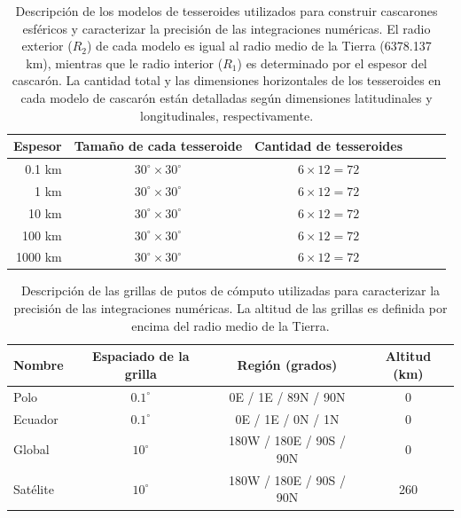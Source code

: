\begin{table}
\caption{
    Descripción de los modelos de tesseroides utilizados para construir
    cascarones esféricos y caracterizar la precisión de las integraciones
    numéricas.
    El radio exterior ($R_2$) de cada modelo es igual al radio medio de la
    Tierra (6378.137 km), mientras que le radio interior ($R_1$) es determinado
    por el espesor del cascarón.
    La cantidad total y las dimensiones horizontales de los tesseroides en cada
    modelo de cascarón están detalladas según dimensiones latitudinales
    y longitudinales, respectivamente.
    \newline
}
\label{tab:shell-models}
\centering
\begin{tabular}{rccccc}
    Espesor & Tamaño de cada tesseroide  & Cantidad de tesseroides \\ \hline
    0.1 km  & $30^\circ \times 30^\circ$ & $6 \times 12 = 72$ \\
    1 km    & $30^\circ \times 30^\circ$ & $6 \times 12 = 72$ \\
    10 km   & $30^\circ \times 30^\circ$ & $6 \times 12 = 72$ \\
    100 km  & $30^\circ \times 30^\circ$ & $6 \times 12 = 72$ \\
    1000 km & $30^\circ \times 30^\circ$ & $6 \times 12 = 72$ \\
\end{tabular}
\end{table}

\begin{table}
\caption{
    Descripción de las grillas de putos de cómputo utilizadas para caracterizar
    la precisión de las integraciones numéricas.
    La altitud de las grillas es definida por encima del radio medio de la
    Tierra.
    \newline
}
\label{tab:grids}
\centering
\begin{tabular}{lccc}
    Nombre & Espaciado de la grilla & Región (grados) & Altitud (km)
    \\ \hline
    Polo      & $0.1^\circ$ &   0E /   1E / 89N / 90N & 0   \\
    Ecuador   & $0.1^\circ$ &   0E /   1E /  0N / 1N  & 0   \\
    Global    & $ 10^\circ$ & 180W / 180E / 90S / 90N & 0   \\
    Satélite  & $ 10^\circ$ & 180W / 180E / 90S / 90N & 260 \\
\end{tabular}
\end{table}


